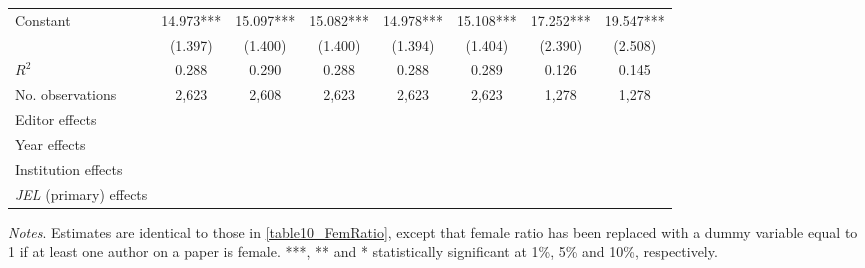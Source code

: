 \begin{table}
\begin{adjustwidth}{-0.085cm}{}
\begin{threeparttable}
\begin{tabular}{p{2.64cm}SSSSSSS}
            Constant                      &      14.973***&      15.097***&      15.082***&      14.978***&      15.108***&      17.252***&      19.547***\\
                                          &     (1.397)   &     (1.400)   &     (1.400)   &     (1.394)   &     (1.404)   &     (2.390)   &     (2.508)   \\
            \midrule
            \(R^2\)                       &       0.288   &       0.290   &       0.288   &       0.288   &       0.289   &       0.126   &       0.145   \\
            No. observations              &       2,623   &       2,608   &       2,623   &       2,623   &       2,623   &       1,278   &       1,278   \\
            \midrule
            Editor effects       &           {}   &           {}   &           {}   &           {}   &           {}   &           {}   &           {}   \\
            Year effects                  &           {}   &           {}   &           {}   &           {}   &           {}   &           {}   &           {}   \\
            Institution effects           &           {}   &           {}   &           {}   &           {}   &           {}   &           {}   &           {}   \\
            \textit{JEL} (primary) effects&               &               &               &               &               &               &           {}   \\
            \bottomrule
        \end{tabular}
        \begin{tablenotes}
            \tiny
            \item \textit{Notes}. Estimates are identical to those in \autoref{table10_FemRatio}, except that female ratio has been replaced with a dummy variable equal to 1 if at least one author on a paper is female. ***, ** and * statistically significant at 1\%, 5\% and 10\%, respectively.
        \end{tablenotes}
    \end{threeparttable}
    \end{adjustwidth}
\end{table}